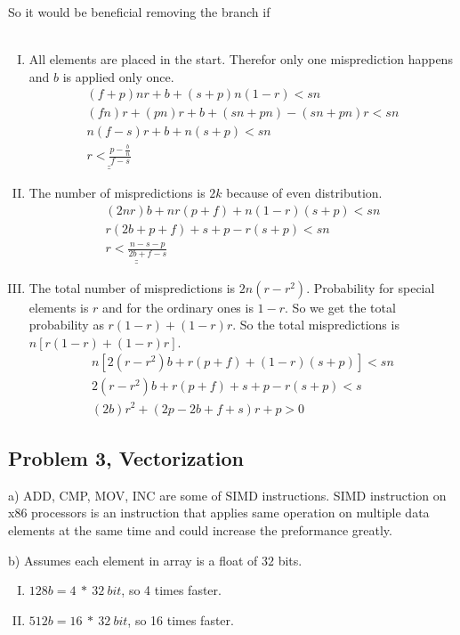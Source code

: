 \documentclass{article}
\begin{document}
So it would be beneficial removing the branch if \\~\\
\begin{enumerate}[I)]

    \item All elements are placed in the start. Therefor only one misprediction happens and $b$ is applied only once.
	\begin{align*}
	(f+p)nr + b + (s+p)n(1-r) < sn  \\
	(fn)r+(pn)r+b+(sn+pn)-(sn+pn)r < sn \\ 
	n(f-s)r + b + n(s+p) < sn \\
	\underline{\underline{r< \frac{p-\frac{b}{n}}{f-s}}}
	\end{align*}

    \item The number of mispredictions is $2k$ because of even distribution.
	\begin{align*}
	(2nr)b + nr(p+f) + n(1-r)(s+p) < sn \\
	r(2b+p+f) + s+p-r(s+p) < sn \\
	\underline{\underline{r<\frac{n-s-p}{2b+f-s}}}
	\end{align*}

    \item The total number of mispredictions is $2n(r-r^2)$. Probability for special elements is $r$ and for the ordinary ones is $1-r$. So we get the total probability as $r(1-r) + (1-r)r$. So the total mispredictions is $n[ r(1-r) + (1-r)r]$.
	\begin{align*}
	n[2(r-r^2)b + r(p+f) + (1-r)(s+p)] < sn \\
	2(r-r^2)b + r(p+f) + s+p - r(s+p) < s \\
	(2b)r^2 + (2p-2b+f+s)r +p > 0
	\end{align*}
	\end{enumerate}

\subsection{Problem 3, Vectorization}
\begin{flushleft}
a) ADD, CMP, MOV, INC are some of SIMD instructions. SIMD instruction on x86 processors is an instruction that applies same operation on multiple data elements at the same time and could increase the preformance greatly. 


\end{flushleft}
\begin{flushleft}
b) Assumes each element in array is a float of $32$ bits.\\
\begin{enumerate}[I)]

\item $128 b = 4\ *\  32\ bit $, so 4 times faster. 
\item $512 b = 16\ *\ 32\ bit $, so 16 times faster.

\end{enumerate}

\end{flushleft}
\newpage
\end{document}
